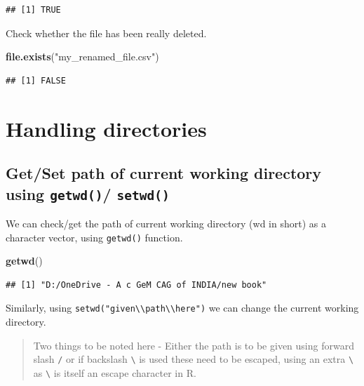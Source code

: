 \documentclass[
]{book}
\newenvironment{Shaded}{\begin{snugshade}}{\end{snugshade}}
\newcommand{\FunctionTok}[1]{\textcolor[rgb]{0.13,0.29,0.53}{\textbf{#1}}}
\newcommand{\NormalTok}[1]{#1}
\newcommand{\StringTok}[1]{\textcolor[rgb]{0.31,0.60,0.02}{#1}}
\begin{document}
\begin{verbatim}
## [1] TRUE
\end{verbatim}

Check whether the file has been really deleted.

\begin{Shaded}
\begin{Highlighting}[]
\FunctionTok{file.exists}\NormalTok{(}\StringTok{"my\_renamed\_file.csv"}\NormalTok{)}
\end{Highlighting}
\end{Shaded}

\begin{verbatim}
## [1] FALSE
\end{verbatim}

\hypertarget{handling-directories}{%
\section{Handling directories}\label{handling-directories}}

\hypertarget{getset-path-of-current-working-directory-using-getwd-setwd}{%
\subsection{\texorpdfstring{Get/Set path of current working directory using \texttt{getwd()}/ \texttt{setwd()}}{Get/Set path of current working directory using getwd()/ setwd()}}\label{getset-path-of-current-working-directory-using-getwd-setwd}}

We can check/get the path of current working directory (wd in short) as a character vector, using \texttt{getwd()}  function.

\begin{Shaded}
\begin{Highlighting}[]
\FunctionTok{getwd}\NormalTok{()}
\end{Highlighting}
\end{Shaded}

\begin{verbatim}
## [1] "D:/OneDrive - A c GeM CAG of INDIA/new book"
\end{verbatim}

Similarly, using \texttt{setwd("given\textbackslash{}\textbackslash{}path\textbackslash{}\textbackslash{}here")} we can change the current working directory.

\begin{quote}
Two things to be noted here - Either the path is to be given using forward slash \texttt{/} or if backslash \texttt{\textbackslash{}} is used these need to be escaped, using an extra \texttt{\textbackslash{}} as \texttt{\textbackslash{}} is itself an escape character in R.
\end{quote}
\end{document}

